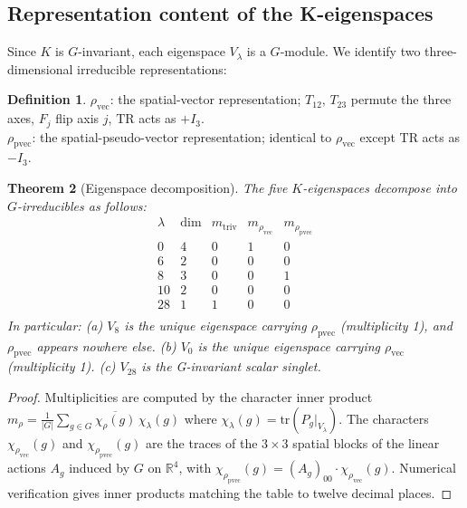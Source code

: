 \documentclass[12pt,a4paper]{article}
\theoremstyle{plain}
\newtheorem{theorem}{Theorem}[section]
\theoremstyle{definition}
\newtheorem{definition}[theorem]{Definition}
\newcommand{\R}{\mathbb{R}}
\newcommand{\tr}{\mathrm{tr}}
\newcommand{\rhovec}{\rho_{\mathrm{vec}}}
\newcommand{\rhopvec}{\rho_{\mathrm{pvec}}}
\begin{document}
\subsection{Representation content of the K-eigenspaces}

Since $K$ is $G$-invariant, each eigenspace $V_\lambda$ is a $G$-module.
We identify two three-dimensional irreducible representations:

\begin{definition}
  $\rhovec$: the spatial-vector representation; $T_{12}$, $T_{23}$
  permute the three axes, $F_j$ flip axis $j$, $\mathrm{TR}$ acts as $+I_3$.\\
  $\rhopvec$: the spatial-pseudo-vector representation; identical to
  $\rhovec$ except $\mathrm{TR}$ acts as $-I_3$.
\end{definition}

\begin{theorem}[Eigenspace decomposition]
\label{thm:irreps}
  The five $K$-eigenspaces decompose into $G$-irreducibles as follows:
  \begin{equation}
    \begin{array}{c|c|c|c|c}
    \lambda & \dim & m_{\mathrm{triv}} & m_{\rhovec} & m_{\rhopvec} \\
    \hline
    0  & 4 & 0 & 1 & 0 \\
    6  & 2 & 0 & 0 & 0 \\
    8  & 3 & 0 & 0 & 1 \\
    10 & 2 & 0 & 0 & 0 \\
    28 & 1 & 1 & 0 & 0 \\
    \end{array}
  \end{equation}
  In particular:
  (a) $V_8$ is the unique eigenspace carrying $\rhopvec$ (multiplicity 1),
  and $\rhopvec$ appears nowhere else.
  (b) $V_0$ is the unique eigenspace carrying $\rhovec$ (multiplicity 1).
  (c) $V_{28}$ is the G-invariant scalar singlet.
\end{theorem}

\begin{proof}
  Multiplicities are computed by the character inner product
  $m_\rho = \frac{1}{|G|}\sum_{g\in G} \overline{\chi_\rho(g)}\,\chi_\lambda(g)$
  where $\chi_\lambda(g) = \tr(P_g|_{V_\lambda})$.  The characters
  $\chi_{\rhovec}(g)$ and $\chi_{\rhopvec}(g)$ are the traces of the
  $3\times 3$ spatial blocks of the linear actions $A_g$ induced by $G$
  on $\R^4$, with $\chi_{\rhopvec}(g) = (A_g)_{00} \cdot \chi_{\rhovec}(g)$.
  Numerical verification gives inner products matching the table to
  twelve decimal places.
\end{proof}
\end{document}
